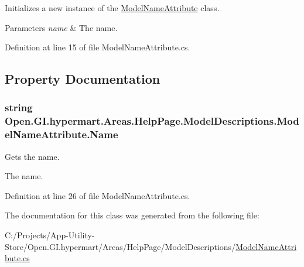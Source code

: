 Initializes a new instance of the \hyperlink{class_open_1_1_g_i_1_1hypermart_1_1_areas_1_1_help_page_1_1_model_descriptions_1_1_model_name_attribute}{Model\+Name\+Attribute} class. 


\begin{DoxyParams}{Parameters}
{\em name} & The name.\\
\hline
\end{DoxyParams}


Definition at line 15 of file Model\+Name\+Attribute.\+cs.



\subsection{Property Documentation}
\hypertarget{class_open_1_1_g_i_1_1hypermart_1_1_areas_1_1_help_page_1_1_model_descriptions_1_1_model_name_attribute_a1388599f97bb13f4b52da9cebfd994d3}{}
\subsubsection[{Name}]{\setlength{\rightskip}{0pt plus 5cm}string Open.\+G\+I.\+hypermart.\+Areas.\+Help\+Page.\+Model\+Descriptions.\+Model\+Name\+Attribute.\+Name\hspace{0.3cm}{\ttfamily [get]}}\label{class_open_1_1_g_i_1_1hypermart_1_1_areas_1_1_help_page_1_1_model_descriptions_1_1_model_name_attribute_a1388599f97bb13f4b52da9cebfd994d3}


Gets the name. 

The name. 

Definition at line 26 of file Model\+Name\+Attribute.\+cs.



The documentation for this class was generated from the following file\+:\begin{DoxyCompactItemize}
\item 
C\+:/\+Projects/\+App-\/\+Utility-\/\+Store/\+Open.\+G\+I.\+hypermart/\+Areas/\+Help\+Page/\+Model\+Descriptions/\hyperlink{_model_name_attribute_8cs}{Model\+Name\+Attribute.\+cs}\end{DoxyCompactItemize}
